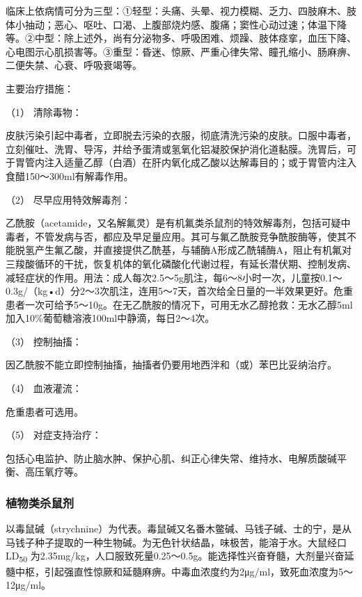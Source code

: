 临床上依病情可分为三型：①轻型：头痛、头晕、视力模糊、乏力、四肢麻木、肢体小抽动；恶心、呕吐、口渴、上腹部烧灼感、腹痛；窦性心动过速；体温下降等。②中型：除上述外，尚有分泌物多、呼吸困难、烦躁、肢体痉挛，血压下降、心电图示心肌损害等。③重型：昏迷、惊厥、严重心律失常、瞳孔缩小、肠麻痹、二便失禁、心衰、呼吸衰竭等。

主要治疗措施：

\hypertarget{text00144.htmlux5cux23CHP5-3-6-2-1}{}
（1） 清除毒物：

皮肤污染引起中毒者，立即脱去污染的衣服，彻底清洗污染的皮肤。口服中毒者，立刻催吐、洗胃、导泻，并给予蛋清或氢氧化铝凝胶保护消化道黏膜。洗胃后，可于胃管内注入适量乙醇（白酒）在肝内氧化成乙酸以达解毒目的；或于胃管内注入食醋150～300ml有解毒作用。

\hypertarget{text00144.htmlux5cux23CHP5-3-6-2-2}{}
（2） 尽早应用特效解毒剂：

乙酰胺（acetamide，又名解氟灵）是有机氟类杀鼠剂的特效解毒剂，包括可疑中毒者，不管发病与否，都应及早足量应用。其可与氟乙酰胺竞争酰胺酶等，使其不能脱氢产生氟乙酸，并直接提供乙酰基，与辅酶A形成乙酰辅酶A，阻止有机氟对三羧酸循环的干扰，恢复机体的氧化磷酸化代谢过程，有延长潜伏期、控制发病、减轻症状的作用。用法：成人每次2.5～5g肌注，每6～8小时一次，儿童按0.1～0.3g/（kg•d）分2～3次肌注，连用5～7天，首次给全日量的一半效果更好。危重患者一次可给予5～10g。在无乙酰胺的情况下，可用无水乙醇抢救：无水乙醇5ml加入10\%葡萄糖溶液100ml中静滴，每日2～4次。

\hypertarget{text00144.htmlux5cux23CHP5-3-6-2-3}{}
（3） 控制抽搐：

因乙酰胺不能立即控制抽搐，抽搐者仍要用地西泮和（或）苯巴比妥纳治疗。

\hypertarget{text00144.htmlux5cux23CHP5-3-6-2-4}{}
（4） 血液灌流：

危重患者可选用。

\hypertarget{text00144.htmlux5cux23CHP5-3-6-2-5}{}
（5） 对症支持治疗：

包括心电监护、防止脑水肿、保护心肌、纠正心律失常、维持水、电解质酸碱平衡、高压氧疗等。

\subsubsection{植物类杀鼠剂}

以毒鼠碱（strychnine）为代表。毒鼠碱又名番木鳖碱、马钱子碱、士的宁，是从马钱子种子提取的一种生物碱。为无色针状结晶，味极苦，能溶于水。大鼠经口LD\textsubscript{50}
为2.35mg/kg，人口服致死量0.25～0.5g。能选择性兴奋脊髓，大剂量兴奋延髓中枢，引起强直性惊厥和延髓麻痹。中毒血浓度约为2μg/ml，致死血浓度为5～12μg/ml。

